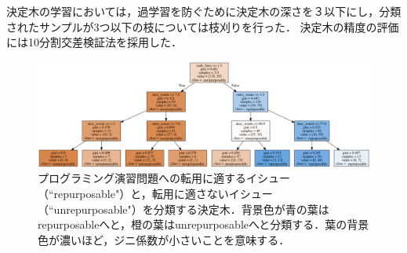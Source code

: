 
決定木の学習においては，過学習を防ぐために決定木の深さを３以下にし，分類されたサンプルが3つ以下の枝については枝刈りを行った．
決定木の精度の評価には10分割交差検証法を採用した．




\begin{figure}[t]
	\centering
	\vspace{0.2cm}
  \includegraphics[width=1.0\columnwidth]{graph_20190125.png}
  \vspace{0.2cm}
  \caption{プログラミング演習問題への転用に適するイシュー（``repurposable"）と，転用に適さないイシュー（``unrepurposable"）を分類する決定木．背景色が青の葉はrepurposableへと，橙の葉はunrepurposableへと分類する．葉の背景色が濃いほど，ジニ係数が小さいことを意味する．}
  \label{fig:dtgraph}
\end{figure}


